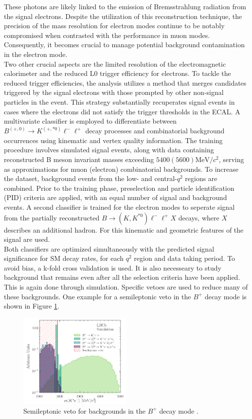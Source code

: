 \documentclass[%
 reprint,
 amsmath,amssymb,
 aps,
]{revtex4-2}
\begin{document}
 These photons are likely linked to the emission of Bremsstrahlung radiation from the signal electrons. 
 Despite the utilization of this reconstruction technique, the precision of the mass resolution for electron modes continue to be notably compromised 
 when contrasted with the performance in muon modes. Consequently, it becomes crucial to manage potential background contamination in the electron mode.
\\
Two other crucial aspects are the limited resolution of the electromagnetic calorimeter and the reduced L0 trigger efficiency for electrons. 
To tackle the reduced trigger efficiencies, the analysis utilizes a method that merges candidates triggered by the signal electrons with those prompted by other non-signal particles in the event. 
This strategy substantially recuperates signal events in cases where the electrons did not satisfy the trigger thresholds in the ECAL.
A multivariate classifier is employed to differentiate between $B^{(+, 0)} \rightarrow K^{(+, * 0)}{\ell}^{-} {\ell}^{+}$ decay processes and combinatorial background occurrences using 
kinematic and vertex quality information.
The training procedure involves simulated signal events, along with data containing reconstructed B meson invariant masses exceeding $5400 (5600) {\si{\mega\electronvolt}}/c^2$, 
serving as approximations for muon (electron) combinatorial backgrounds. 
To increase the dataset, background events from the low- and central-$q^2$ regions are combined.
Prior to the training phase, preselection and particle identification (PID) criteria are applied, with an equal number of signal and background events.
A second classifier is trained for the electron modes to seperate signal from the partially reconstructed $B \rightarrow (K, K^{*0}){\ell}^{-} {\ell}^{+}X$ decays, 
where $X$ describes an additional hadron. For this kinematic and geometric features of the signal are used. 
\\
Both classifiers are optimized simultaneously with the predicted signal significance for SM decay rates, for each $q^2$ region and data taking period.
To avoid bias, a k-fold cross validation is used.
It is also necesseary to study background that remains even after all the selection criteria have been applied. This is again done through simulation.
Specific vetoes are used to reduce many of these backgrounds. One example for a semileptonic veto in the $B^+$ decay mode is shown in Figure \ref{fig:2}.
\begin{figure}
    \centering
    \includegraphics[width=0.5\textwidth]{veto2.png}
    \caption{Semileptonic veto for backgrounds in the $B^+$ decay mode \cite{lhcbcollaboration2022measurement}.}
    \label{fig:2}
\end{figure}
\end{document}
